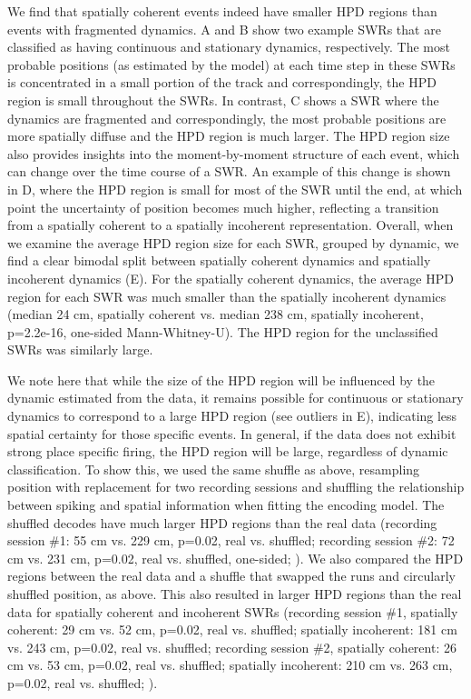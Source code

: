 \documentclass[9pt,lineno]{elife}
\begin{document}
We find that spatially coherent events indeed have smaller HPD regions than events with fragmented dynamics. A and B show two example SWRs that are classified as having continuous and stationary dynamics, respectively. The most probable positions (as estimated by the model) at each time step in these SWRs is concentrated in a small portion of the track and correspondingly, the HPD region is small throughout the SWRs. In contrast, C shows a SWR where the dynamics are fragmented and correspondingly, the most probable positions are more spatially diffuse and the HPD region is much larger. The HPD region size also provides insights into the moment-by-moment structure of each event, which can change over the time course of a SWR. An example of this change is shown in D, where the HPD region is small for most of the SWR until the end, at which point the uncertainty of position becomes much higher, reflecting a transition from a spatially coherent to a spatially incoherent representation. Overall, when we examine the average HPD region size for each SWR, grouped by dynamic, we find a clear bimodal split between spatially coherent dynamics and spatially incoherent dynamics (E). For the spatially coherent dynamics, the average HPD region for each SWR was much smaller than the spatially incoherent dynamics (median 24 cm, spatially coherent vs. median 238 cm, spatially incoherent, p=2.2e-16, one-sided Mann-Whitney-U). The HPD region for the unclassified SWRs was similarly large.

We note here that while the size of the HPD region will be influenced by the dynamic estimated from the data, it remains possible for continuous or stationary dynamics to correspond to a large HPD region (see outliers in E), indicating less spatial certainty for those specific events. In general, if the data does not exhibit strong place specific firing, the HPD region will be large, regardless of dynamic classification. To show this, we used the same shuffle as above, resampling position with replacement for two recording sessions and shuffling the relationship between spiking and spatial information when fitting the encoding model. The shuffled decodes have much larger HPD regions than the real data (recording session \#1: 55 cm vs. 229 cm, p=0.02, real vs. shuffled; recording session \#2: 72 cm vs. 231 cm, p=0.02, real vs. shuffled, one-sided; ). We also compared the HPD regions between the real data and a shuffle that swapped the runs and circularly shuffled position, as above. This also resulted in larger HPD regions than the real data for spatially coherent and incoherent SWRs (recording session \#1, spatially coherent: 29 cm vs. 52 cm, p=0.02, real vs. shuffled; spatially incoherent: 181 cm vs. 243 cm, p=0.02, real vs. shuffled; recording session \#2, spatially coherent: 26 cm vs. 53 cm, p=0.02, real vs. shuffled; spatially incoherent: 210 cm vs. 263 cm, p=0.02, real vs. shuffled; ).
\end{document}
